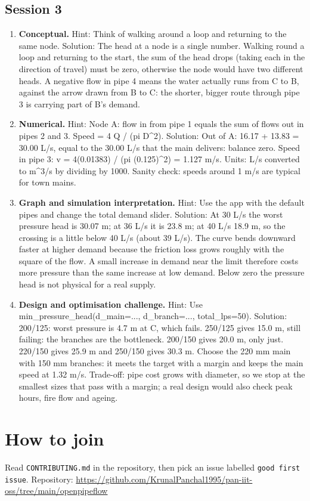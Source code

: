 \documentclass[11pt,a4paper]{article}
\begin{document}
\subsection*{Session 3}
\begin{enumerate}[nosep]
\item \textbf{Conceptual.} Hint: Think of walking around a loop and returning to the same node. Solution: The head at a node is a single number. Walking round a loop and returning to the start, the sum of the head drops (taking each in the direction of travel) must be zero, otherwise the node would have two different heads. A negative flow in pipe 4 means the water actually runs from C to B, against the arrow drawn from B to C: the shorter, bigger route through pipe 3 is carrying part of B's demand.
\item \textbf{Numerical.} Hint: Node A: flow in from pipe 1 equals the sum of flows out in pipes 2 and 3. Speed = 4 Q / (pi D\textasciicircum{}2). Solution: Out of A: 16.17 + 13.83 = 30.00 L/s, equal to the 30.00 L/s that the main delivers: balance zero. Speed in pipe 3: v = 4(0.01383) / (pi (0.125)\textasciicircum{}2) = 1.127 m/s. Units: L/s converted to m\textasciicircum{}3/s by dividing by 1000. Sanity check: speeds around 1 m/s are typical for town mains.
\item \textbf{Graph and simulation interpretation.} Hint: Use the app with the default pipes and change the total demand slider. Solution: At 30 L/s the worst pressure head is 30.07 m; at 36 L/s it is 23.8 m; at 40 L/s 18.9 m, so the crossing is a little below 40 L/s (about 39 L/s). The curve bends downward faster at higher demand because the friction loss grows roughly with the square of the flow. A small increase in demand near the limit therefore costs more pressure than the same increase at low demand. Below zero the pressure head is not physical for a real supply.
\item \textbf{Design and optimisation challenge.} Hint: Use min\_pressure\_head(d\_main=..., d\_branch=..., total\_lps=50). Solution: 200/125: worst pressure is 4.7 m at C, which fails. 250/125 gives 15.0 m, still failing: the branches are the bottleneck. 200/150 gives 20.0 m, only just. 220/150 gives 25.9 m and 250/150 gives 30.3 m. Choose the 220 mm main with 150 mm branches: it meets the target with a margin and keeps the main speed at 1.32 m/s. Trade-off: pipe cost grows with diameter, so we stop at the smallest sizes that pass with a margin; a real design would also check peak hours, fire flow and ageing.
\end{enumerate}

\section{How to join}
Read \texttt{CONTRIBUTING.md} in the repository, then pick an issue labelled \texttt{good first issue}. Repository: \url{https://github.com/KrunalPanchal1995/pan-iit-oss/tree/main/openpipeflow}
\end{document}
